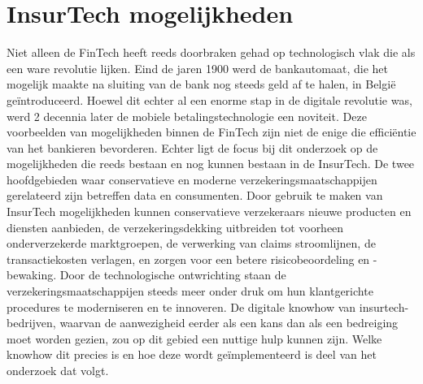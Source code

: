 \section{InsurTech mogelijkheden}

Niet alleen de FinTech heeft reeds doorbraken gehad op technologisch vlak die als een ware revolutie lijken. Eind de jaren 1900 werd de bankautomaat, die het mogelijk maakte na sluiting van de bank nog steeds geld af te halen, in België geïntroduceerd. Hoewel dit echter al een enorme stap in de digitale revolutie was, werd 2 decennia later de mobiele betalingstechnologie een noviteit. \autocite{agarwal2020real} Deze voorbeelden van mogelijkheden binnen de FinTech zijn niet de enige die efficiëntie van het bankieren bevorderen. Echter ligt de focus bij dit onderzoek op de mogelijkheden die reeds bestaan en nog kunnen bestaan in de InsurTech. De twee hoofdgebieden waar conservatieve en moderne verzekeringsmaatschappijen gerelateerd zijn betreffen data en consumenten. Door gebruik te maken van InsurTech mogelijkheden kunnen conservatieve verzekeraars nieuwe producten en diensten aanbieden, de verzekeringsdekking uitbreiden tot voorheen onderverzekerde marktgroepen, de verwerking van claims stroomlijnen, de transactiekosten verlagen, en zorgen voor een betere risicobeoordeling en -bewaking. Door de technologische ontwrichting staan de verzekeringsmaatschappijen steeds meer onder druk om hun klantgerichte procedures te moderniseren en te innoveren. De digitale knowhow van insurtech-bedrijven, waarvan de aanwezigheid eerder als een kans dan als een bedreiging moet worden gezien, zou op dit gebied een nuttige hulp kunnen zijn. Welke knowhow dit precies is en hoe deze wordt geïmplementeerd is deel van het onderzoek dat volgt. \autocite{koprivica2018insurtech}
